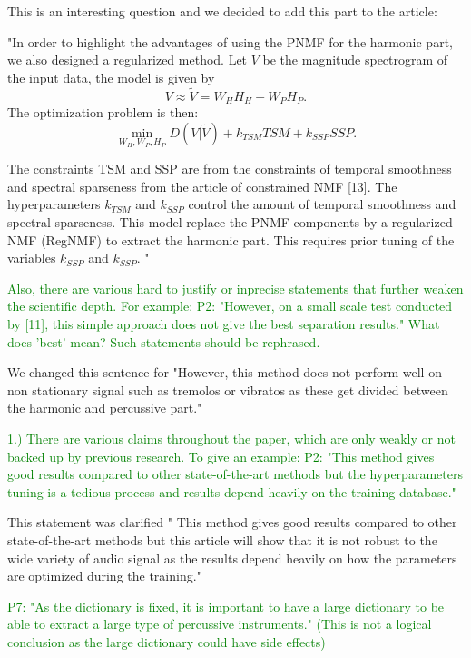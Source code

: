 \documentclass[]{article}
\begin{document}
This is an interesting question and we decided to add this part to the article: \

"In order to highlight the advantages of using the PNMF for the harmonic part, we also designed a regularized method. Let $V$ be the magnitude spectrogram of the input data, the model is given by 
\begin{equation}
V \approx \tilde{V} = W_HH_H + W_P  H_P.
\end{equation}
The optimization problem is then:
\begin{equation}\label{REGNMF}
\min_{W_{H},W_{P},H_{P}}D(V|\tilde{V}) + k_{TSM} TSM + k_{SSP} SSP.
\end{equation} 

The constraints TSM and SSP are from the constraints of temporal smoothness and spectral sparseness from the article of constrained NMF [13]. The hyperparameters $k_{TSM}$ and $k_{SSP}$ control the amount of temporal smoothness and spectral sparseness. This model replace the PNMF components by a regularized NMF (RegNMF) to extract the harmonic part. This requires prior tuning of the variables $k_{SSP}$ and $k_{SSP}$. "





\textcolor{green}{Also, there are various hard to justify or inprecise statements that further weaken the scientific depth. For example:
P2: "However, on a small scale test conducted by [11], this simple approach does not give the best separation results." What does 'best' mean? Such statements should be rephrased.
}

We changed this sentence for "However, this method does not perform well on non stationary signal such as tremolos or vibratos as these get divided between the harmonic and percussive part."


\textcolor{green}{1.) There are various claims throughout the paper, which are only weakly or not backed up by previous research. To give an example:
P2: "This method gives good results compared to other state-of-the-art methods but the hyperparameters tuning is a tedious process and results depend heavily on the training database."}

This statement was clarified " This method gives good results compared to other state-of-the-art methods but this article will show that it is not robust to the wide variety of audio signal as the results depend heavily on how the parameters are optimized during the training."

\textcolor{green}{P7: "As the dictionary is fixed, it is important to have a large dictionary to be able to extract a large type of percussive instruments." (This is not a logical conclusion as the large dictionary could have side effects)}
\end{document}
